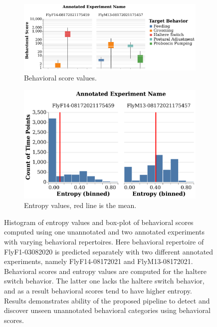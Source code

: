 \begin{figure}[ht!]
	\centering
	\begin{subfigure}[h]{0.55\linewidth}
		\centering\includegraphics[width=\linewidth]{figures/BehavioralScores-RepertoireDifference.pdf}
		\caption{Behavioral score values.}
	\end{subfigure}%
	\centering
	\begin{subfigure}[h]{0.45\linewidth}
		\centering\includegraphics[width=\linewidth]{figures/Entropy-RepertoireDifference.pdf}
		\caption{Entropy values, red line is the mean.}
	\end{subfigure}%
	\caption[Histogram of entropy values and box-plot of the behavioral scores computed using one unannotated and two annotated experiments with varying behavioral repertoires.]{Histogram of entropy values and box-plot of behavioral scores computed using one unannotated and two annotated experiments with varying behavioral repertoires.
		Here behavioral repertoire of FlyF1-03082020 is predicted separately with two different annotated experiments, namely FlyF14-08172021 and FlyM13-08172021.
		Behavioral scores and entropy values are computed for the haltere switch behavior.
		The latter one lacks the haltere switch behavior, and as a result behavioral scores tend to have higher entropy.
		Results demonstrates ability of the proposed pipeline to detect and discover unseen unannotated behavioral categories using behavioral scores.}
\end{figure}

